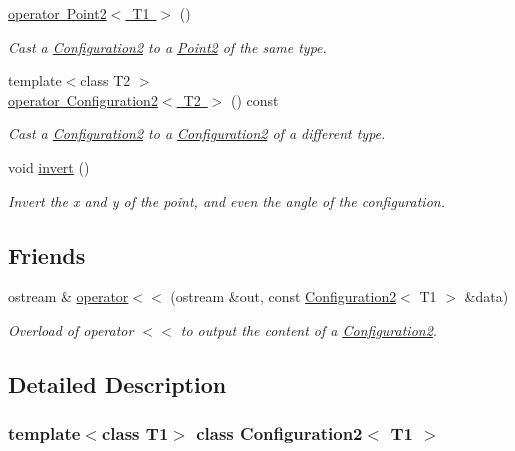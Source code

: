 \begin{DoxyCompactItemize}
\mbox{\hyperlink{class_configuration2_a8f9c571c4438c591dbafbd76eda85a0e}{operator Point2$<$ T1 $>$}} ()
\begin{DoxyCompactList}\small\item\em Cast a {\ttfamily \mbox{\hyperlink{class_configuration2}{Configuration2}}} to a {\ttfamily \mbox{\hyperlink{class_point2}{Point2}}} of the same type. \end{DoxyCompactList}\item 
{\footnotesize template$<$class T2 $>$ }\\\mbox{\hyperlink{class_configuration2_a3bc8dfea259f6d3f97f6770c09ff6526}{operator Configuration2$<$ T2 $>$}} () const
\begin{DoxyCompactList}\small\item\em Cast a {\ttfamily \mbox{\hyperlink{class_configuration2}{Configuration2}}} to a {\ttfamily \mbox{\hyperlink{class_configuration2}{Configuration2}}} of a different type. \end{DoxyCompactList}\item 
void \mbox{\hyperlink{class_configuration2_a0a63aa5b2089b11bf0f6ec9c65560e56}{invert}} ()
\begin{DoxyCompactList}\small\item\em Invert the x and y of the point, and even the angle of the configuration. \end{DoxyCompactList}\end{DoxyCompactItemize}
\subsection*{Friends}
\begin{DoxyCompactItemize}
\item 
ostream \& \mbox{\hyperlink{class_configuration2_a90aec83947c9087504b4a9b6f0db8205}{operator$<$$<$}} (ostream \&out, const \mbox{\hyperlink{class_configuration2}{Configuration2}}$<$ T1 $>$ \&data)
\begin{DoxyCompactList}\small\item\em Overload of operator $<$$<$ to output the content of a {\ttfamily \mbox{\hyperlink{class_configuration2}{Configuration2}}}. \end{DoxyCompactList}\end{DoxyCompactItemize}


\subsection{Detailed Description}
\subsubsection*{template$<$class T1$>$\newline
class Configuration2$<$ T1 $>$}

